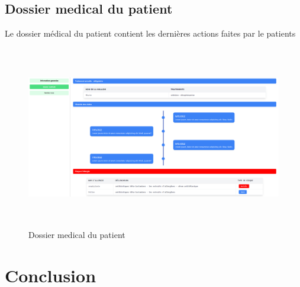 \subsection{Dossier medical du patient}

Le dossier médical du patient contient les dernières actions faites par le patients

\begin{figure}[!h]
\begin{center}
\includegraphics[height=8cm,width=18cm]{med.png}
\end{center}
\caption{Dossier medical du patient}
\end{figure}










\section{Conclusion}